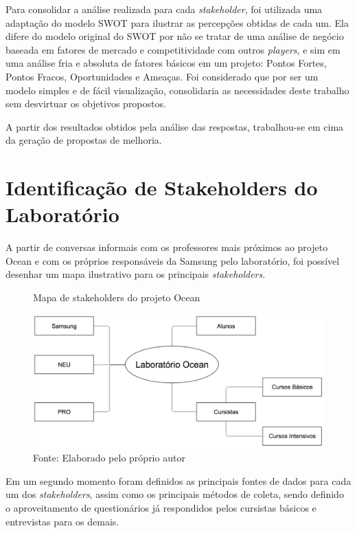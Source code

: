 Para consolidar a análise realizada para cada \textit{stakeholder}, foi utilizada uma adaptação do modelo SWOT para ilustrar as percepções obtidas de cada um. Ela difere do modelo original do SWOT por não se tratar de uma análise de negócio baseada em fatores de mercado e competitividade com outros \textit{players}, e sim em uma análise fria e absoluta de fatores básicos em um projeto: Pontos Fortes, Pontos Fracos, Oportunidades e Ameaças. Foi considerado que por ser um modelo simples e de fácil visualização, consolidaria as necessidades deste trabalho sem desvirtuar os objetivos propostos.

A partir dos resultados obtidos pela análise das respostas, trabalhou-se em cima da geração de propostas de melhoria.

\section{Identificação de Stakeholders do Laboratório}
\label{sec:identificacao_stakeholders}

A partir de conversas informais com os professores mais próximos ao projeto Ocean e com os próprios responsáveis da Samsung pelo laboratório, foi possível desenhar um mapa ilustrativo para os principais \textit{stakeholders}.

\begin{figure}[H]
\caption{Mapa de stakeholders do projeto Ocean}
\centerline{\includegraphics[scale=0.5]{img/stakeholders_v2}}
\label{fig:stakeholders}
\caption* {Fonte: Elaborado pelo próprio autor}
\end{figure}

Em um segundo momento foram definidos as principais fontes de dados para cada um dos \textit{stakeholders}, assim como os principais métodos de coleta, sendo definido o aproveitamento de questionários já respondidos pelos cursistas básicos e entrevistas para os demais.

